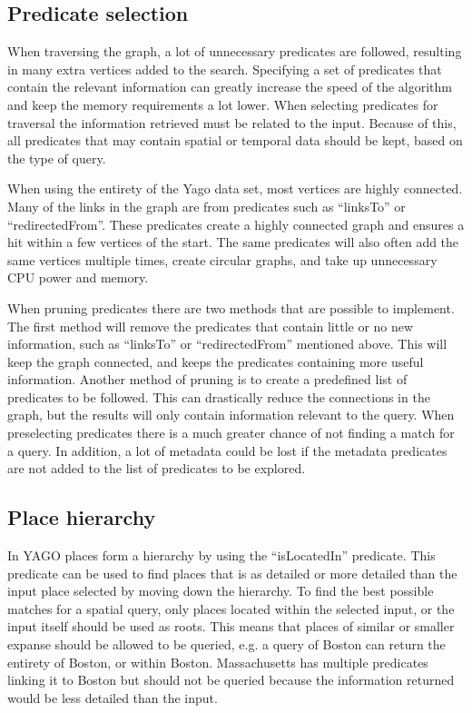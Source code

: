 \subsection{Predicate selection}
When traversing the graph, a lot of unnecessary predicates are followed, resulting in many extra vertices added to the search. Specifying a set of predicates that contain the relevant information can greatly increase the speed of the algorithm and keep the memory requirements a lot lower. When selecting predicates for traversal the information retrieved must be related to the input. Because of this, all predicates that may contain spatial or temporal data should be kept, based on the type of query.

When using the entirety of the Yago data set, most vertices are highly connected. Many of the links in the graph are from predicates such as ``linksTo'' or ``redirectedFrom''. These predicates create a highly connected graph and ensures a hit within a few vertices of the start. The same predicates will also often add the same vertices multiple times, create circular graphs, and take up unnecessary CPU power and memory.

When pruning predicates there are two methods that are possible to implement. The first method will remove the predicates that contain little or no new information, such as ``linksTo'' or ``redirectedFrom'' mentioned above. This will keep the graph connected, and keeps the predicates containing more useful information. Another method of pruning is to create a predefined list of predicates to be followed. This can drastically reduce the connections in the graph, but the results will only contain information relevant to the query. When preselecting predicates there is a much greater chance of not finding a match for a query. In addition, a lot of metadata could be lost if the metadata predicates are not added to the list of predicates to be explored.

\subsection{Place hierarchy}
In YAGO places form a hierarchy by using the ``isLocatedIn'' predicate. This predicate can be used to find places that is as detailed or more detailed than the input place selected by moving down the hierarchy. To find the best possible matches for a spatial query, only places located within the selected input, or the input itself should be used as roots. This means that places of similar or smaller expanse should be allowed to be queried, e.g. a query of Boston can return the entirety of Boston, or within Boston. Massachusetts has multiple predicates linking it to Boston but should not be queried because the information returned would be less detailed than the input. 

\glsresetall